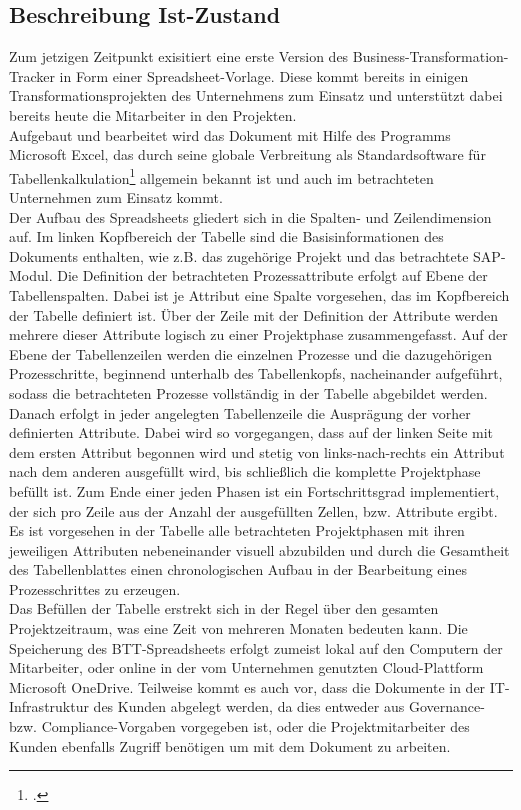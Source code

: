 \subsection{Beschreibung Ist-Zustand}
Zum jetzigen Zeitpunkt exisitiert eine erste Version des Business-Transformation-Tracker in Form einer Spreadsheet-Vorlage. Diese kommt bereits in einigen Transformationsprojekten des Unternehmens zum Einsatz und unterstützt dabei bereits heute die Mitarbeiter in den Projekten.\\ Aufgebaut und bearbeitet wird das Dokument mit Hilfe des Programms Microsoft Excel, das durch seine globale Verbreitung als Standardsoftware für Tabellenkalkulation\footcite[Vgl.][]{wiki-excel} allgemein bekannt ist und auch im betrachteten Unternehmen zum Einsatz kommt.\\
Der Aufbau des Spreadsheets gliedert sich in die Spalten- und Zeilendimension auf. Im linken Kopfbereich der Tabelle sind die Basisinformationen des Dokuments enthalten, wie z.B. das zugehörige Projekt und das betrachtete SAP-Modul. Die Definition der betrachteten Prozessattribute erfolgt auf Ebene der Tabellenspalten. Dabei ist je Attribut eine Spalte vorgesehen, das im Kopfbereich der Tabelle definiert ist. Über der Zeile mit der Definition der Attribute werden mehrere dieser Attribute logisch zu einer Projektphase zusammengefasst. Auf der Ebene der Tabellenzeilen werden die einzelnen Prozesse und die dazugehörigen Prozesschritte, beginnend unterhalb des Tabellenkopfs, nacheinander aufgeführt, sodass die betrachteten Prozesse vollständig in der Tabelle abgebildet werden. Danach erfolgt in jeder angelegten Tabellenzeile die Ausprägung der vorher definierten Attribute. Dabei wird so vorgegangen, dass auf der linken Seite mit dem ersten Attribut begonnen wird und stetig von links-nach-rechts ein Attribut nach dem anderen ausgefüllt wird, bis schließlich die komplette Projektphase befüllt ist. Zum Ende einer jeden Phasen ist ein Fortschrittsgrad implementiert, der sich pro Zeile aus der Anzahl der ausgefüllten Zellen, bzw. Attribute ergibt. Es ist vorgesehen in der Tabelle alle betrachteten Projektphasen mit ihren jeweiligen Attributen nebeneinander visuell abzubilden und durch die Gesamtheit des Tabellenblattes einen chronologischen Aufbau in der Bearbeitung eines Prozesschrittes zu erzeugen.\\Das Befüllen der Tabelle erstrekt sich in der Regel über den gesamten Projektzeitraum, was eine Zeit von mehreren Monaten bedeuten kann. Die Speicherung des BTT-Spreadsheets erfolgt zumeist lokal auf den Computern der Mitarbeiter, oder online in der vom Unternehmen genutzten Cloud-Plattform \glqq{}Microsoft OneDrive\grqq{}. Teilweise kommt es auch vor, dass die Dokumente in der IT-Infrastruktur des Kunden abgelegt werden, da dies entweder aus Governance- bzw. Compliance-Vorgaben vorgegeben ist, oder die Projektmitarbeiter des Kunden ebenfalls Zugriff benötigen um mit dem Dokument zu arbeiten.



